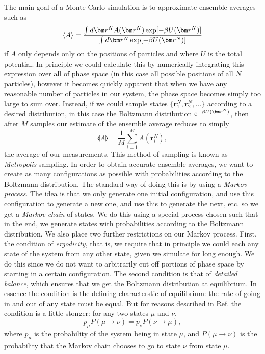 \documentclass[thesis]{subfiles}
\begin{document}
The main goal of a Monte Carlo simulation is to approximate ensemble averages such as
\begin{equation}
	\llangle A \rrangle = \frac{\int d\bm r^N A\argr \exp[-\beta U\argr]}{\int d\bm r^N \exp[-\beta U\argr]}
\end{equation}
if $A$ only depends only on the positions of particles and where $U$ is the total potential. In principle we could calculate this by numerically integrating this expression over all of phase space (in this case all possible positions of all $N$ particles), however it becomes quickly apparent that when we have any reasonable number of particles in our system, the phase space becomes simply too large to sum over. Instead, if we could sample states $\{\bm r^N_1, \bm r^N_2, \ldots \}$ according to a desired distribution, in this case the Boltzmann distribution $\me^{-\beta U\argr}$, then after $M$ samples our estimate of the ensemble average reduces to simply
\begin{equation}
	\llangle A \rrangle = \frac{1}{M}\sum_{i=1}^M A(\bm r^N_i),
\end{equation}
the average of our measurements. This method of sampling is known as \emph{Metropolis} sampling. In order to obtain accurate ensemble averages, we want to create as many configurations as possible with probabilities according to the Boltzmann distribution. The standard way of doing this is by using a \emph{Markov process}\cite{newman1999monte}. The idea is that we only generate one initial configuration, and use this configuration to generate a new one, and use this to generate the next, etc. so we get a \emph{Markov chain} of states. We do this using a special process chosen such that in the end, we generate states with probabilities according to the Boltzmann distribution. We also place two further restrictions on our Markov process. First, the condition of \emph{ergodicity}, that is, we require that in principle we could each any state of the system from any other state, given we simulate for long enough. We do this since we do not want to arbitrarily cut off portions of phase space by starting in a certain configuration. The second condition is that of \emph{detailed balance}, which ensures that we get the Boltzmann distribution at equilibrium. In essence the condition is the defining characterstic of equilibrium: the rate of going in and out of any state must be equal. But for reasons described in Ref. \cite{newman1999monte} the condition is a little stonger: for any two states $\mu$ and $\nu$, $$ p_\mu P(\mu \to \nu) = p_\nu P(\nu \to \mu), $$ where $p_\mu$ is the probability of the system being in state $\mu$, and $P(\mu \to \nu)$ is the probability that the Markov chain chooses to go to state $\nu$ from state $\mu$. 
\end{document}
